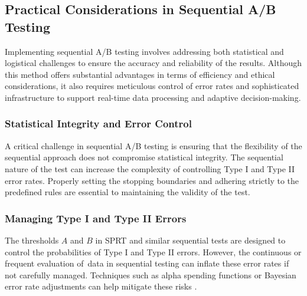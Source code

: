 \documentclass[magisterska, english]{pwr_wmat_praca_dyplomowa}
\theoremstyle{plain}
\numberwithin{theorem}{chapter}
\theoremstyle{definition}
\numberwithin{theorem}{chapter}
\newcommand{\myparagraph}[1]{\paragraph{#1}\mbox{}\\}
\begin{document}
%
%
%
%





\subsection{Practical Considerations in Sequential A/B Testing}
Implementing sequential A/B testing involves addressing both statistical and logistical challenges to ensure the accuracy and reliability of the results. Although this method offers substantial advantages in terms of efficiency and ethical considerations, it also requires meticulous control of error rates and sophisticated infrastructure to support real-time data processing and adaptive decision-making.

\subsubsection{Statistical Integrity and Error Control}
A critical challenge in sequential A/B testing is ensuring that the flexibility of the sequential approach does not compromise statistical integrity. The sequential nature of the test can increase the complexity of controlling Type I and Type II error rates. Properly setting the stopping boundaries and adhering strictly to the predefined rules are essential to maintaining the validity of the test.

\subsubsection{Managing Type I and Type II Errors}
The thresholds \( A \) and \( B \) in SPRT and similar sequential tests are designed to control the probabilities of Type I and Type II errors. However, the continuous or frequent evaluation of~data in sequential testing can inflate these error rates if not carefully managed. Techniques such as alpha spending functions or Bayesian error rate adjustments can help mitigate these risks \cite{DeMets1994}.
\end{document}
